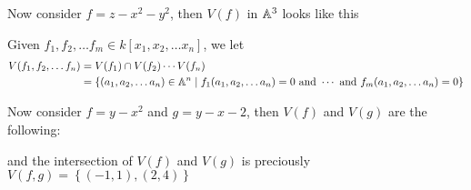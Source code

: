 \begin{example}
Now consider $f = z - x^2 - y^2$, then $V(f)$ in $\mathbb A^3$ looks like this
\begin{center}
\end{center}

\end{example}


\begin{definition}
Given $f_1, f_2, \ldots f_m \in k[x_1, x_2, \ldots x_n]$, we let 
\begin{align*}
V(f_1, f_2, \ldots f_n) &= V(f_1) \cap V(f_2) \cdots V(f_n) \\
&= \left\{ (a_1, a_2, \ldots a_n) \in \mathbb A^n \mid f_1(a_1, a_2, \ldots a_n) = 0 \text{ and } \cdots \text{ and } f_m(a_1, a_2, \ldots a_n) = 0\right\}
\end{align*}
\end{definition}

\begin{example}
Now consider $f = y - x^2$ and $g = y - x - 2$, then $V(f)$ and $V(g)$ are the following: 

\begin{center}
\end{center}
and the intersection of $V(f)$ and $V(g)$ is preciously $V(f,g) = \left\{ (-1,1), (2,4) \right\}$
\end{example}

